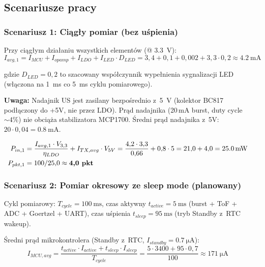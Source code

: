 \documentclass[a4paper,11pt]{article}
\begin{document}
\subsection{Scenariusze pracy}

\subsubsection{Scenariusz 1: Ciągły pomiar (bez uśpienia)}

Przy ciągłym działaniu wszystkich elementów (@ \SI{3,3}{\volt}):
\begin{equation}
    I_{avg,1} = I_{MCU} + I_{opamp} + I_{LDO} + I_{LED} \cdot D_{LED}
    = 3{,}4 + 0{,}1 + 0{,}002 + 3{,}3 \cdot 0{,}2 \approx \SI{4,2}{\milli\ampere}
\end{equation}

gdzie $D_{LED} = 0{,}2$ to szacowany współczynnik wypełnienia sygnalizacji LED
(włączona na \SI{1}{\milli\second} co \SI{5}{\milli\second} cyklu pomiarowego).

\textbf{Uwaga:} Nadajnik US jest zasilany bezpośrednio z~\SI{5}{\volt}
(kolektor BC817 podłączony do +5V, nie przez LDO). Prąd nadajnika
(20\,mA burst, duty cycle ${\sim}4\%$) nie obciąża stabilizatora MCP1700.
Średni prąd nadajnika z~5V: $20 \cdot 0{,}04 = \SI{0,8}{\milli\ampere}$.

\begin{align}
    P_{in,1} &= \frac{I_{avg,1} \cdot V_{3,3}}{\eta_{LDO}} + I_{TX,avg} \cdot V_{5V}
    = \frac{4{,}2 \cdot 3{,}3}{0{,}66} + 0{,}8 \cdot 5 = 21{,}0 + 4{,}0 = \SI{25,0}{\milli\watt} \notag \\
    P_{pkt,1} &= 100/25{,}0 \approx \textbf{4,0~pkt} \notag
\end{align}

\subsubsection{Scenariusz 2: Pomiar okresowy ze sleep mode (planowany)}

Cykl pomiarowy: $T_{cycle} = \SI{100}{\milli\second}$, czas aktywny
$t_{active} = \SI{5}{\milli\second}$ (burst + ToF + ADC + Goertzel + UART),
czas uśpienia $t_{sleep} = \SI{95}{\milli\second}$ (tryb Standby z~RTC wakeup).

Średni prąd mikrokontrolera (Standby z~RTC, $I_{standby} = \SI{0,7}{\micro\ampere}$):
\begin{equation}
    I_{MCU,avg} = \frac{t_{active} \cdot I_{active} + t_{sleep} \cdot I_{sleep}}{T_{cycle}}
    = \frac{5 \cdot 3400 + 95 \cdot 0{,}7}{100} \approx \SI{171}{\micro\ampere}
    \label{eq:imcu_avg}
\end{equation}
\end{document}
